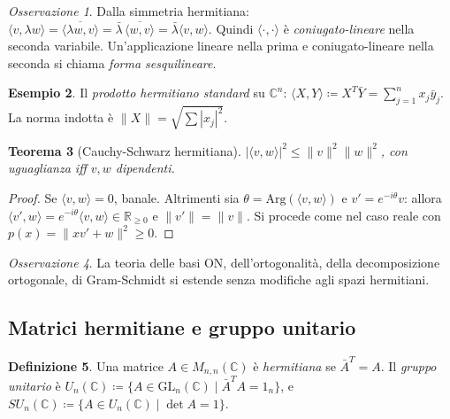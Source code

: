 \documentclass[11pt, a4paper]{book}
\theoremstyle{definition}
\newtheorem{definizione}{Definizione}[section]
\newtheorem{esempio}[definizione]{Esempio}
\theoremstyle{plain}
\newtheorem{teorema}[definizione]{Teorema}
\theoremstyle{remark}
\newtheorem{osservazione}[definizione]{Osservazione}
\newcommand{\R}{\mathbb{R}}
\newcommand{\C}{\mathbb{C}}
\newcommand{\GL}{\mathrm{GL}}
\begin{document}
\begin{osservazione}
Dalla simmetria hermitiana: $\langle v,\lambda w\rangle = \overline{\langle \lambda w,v\rangle} = \bar\lambda\,\overline{\langle w,v\rangle} = \bar\lambda\langle v,w\rangle$. Quindi $\langle\cdot,\cdot\rangle$ è \emph{coniugato-lineare} nella seconda variabile. Un'applicazione lineare nella prima e coniugato-lineare nella seconda si chiama \emph{forma sesquilineare}.
\end{osservazione}

\begin{exbox}
\begin{esempio}
Il \emph{prodotto hermitiano standard} su $\C^n$: $\langle X,Y\rangle \coloneqq X^T \bar Y = \sum_{j=1}^n x_j \bar y_j$. La norma indotta è $\|X\| = \sqrt{\sum|x_j|^2}$.
\end{esempio}
\end{exbox}

\begin{teorema}[Cauchy-Schwarz hermitiana]
\label{thm:cs-hermitiana}
$|\langle v,w\rangle|^2 \leq \|v\|^2\|w\|^2$, con uguaglianza iff $v,w$ dipendenti.
\end{teorema}

\begin{proof}
Se $\langle v,w\rangle = 0$, banale. Altrimenti sia $\theta = \mathrm{Arg}(\langle v,w\rangle)$ e $v' = e^{-i\theta}v$: allora $\langle v',w\rangle = e^{-i\theta}\langle v,w\rangle \in \R_{\geq 0}$ e $\|v'\|=\|v\|$. Si procede come nel caso reale con $p(x) = \|xv'+w\|^2 \geq 0$.
\end{proof}

\begin{osservazione}
La teoria delle basi ON, dell'ortogonalità, della decomposizione ortogonale, di Gram-Schmidt si estende senza modifiche agli spazi hermitiani.
\end{osservazione}

\subsection{Matrici hermitiane e gruppo unitario}

\begin{defbox}
\begin{definizione}
Una matrice $A \in M_{n,n}(\C)$ è \emph{hermitiana} se $\bar A^T = A$. Il \emph{gruppo unitario} è $U_n(\C) \coloneqq \{A \in \GL_n(\C) \mid \bar A^T A = 1_n\}$, e $SU_n(\C) \coloneqq \{A \in U_n(\C) \mid \det A = 1\}$.
\end{definizione}
\end{defbox}
\end{document}
